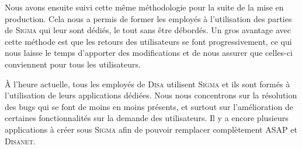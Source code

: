 Nous avons ensuite suivi cette même méthodologie pour la suite de la mise en production.
Cela nous a permis de former les employés à l'utilisation des parties de \textsc{Sigma} qui leur sont dédiés, le tout sans être débordés.
Un gros avantage avec cette méthode est que les retours des utilisateurs se font progressivement, ce qui nous laisse le temps d'apporter des modifications et de nous assurer que celles-ci conviennent pour tous les utilisateurs.

À l'heure actuelle, tous les employés de \textsc{Disa} utilisent \textsc{Sigma} et ils sont formés à l'utilisation de leurs applications dédiées.
Nous nous concentrons sur la résolution des bugs qui se font de moins en moins présents, et surtout sur l'amélioration de certaines fonctionnalités sur la demande des utilisateurs.
Il y a encore plusieurs applications à créer sous \textsc{Sigma} afin de pouvoir remplacer complètement ASAP et \textsc{Disanet}.

